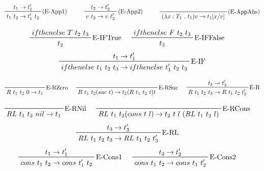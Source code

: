 \documentclass[12pt, titlepage, a4paper]{article}
\begin{document}
\begin{displaymath}
    \prftree[r]{(E-App1)}{t_1 \rightarrow t_1'}{t_1 \ t_2 \rightarrow t_1' \ t_2}  \hspace{1cm}
    \prftree[r]{(E-App2)}{t_2 \rightarrow t_2'}{v \ t_2 \rightarrow v \ t_2'}  \hspace{1cm}
    \prftree[r]{(E-AppAbs)}{}{(\lambda x : T_1 \ . \ t_1 ) v \rightarrow t_1[x/v]}
\end{displaymath}

\begin{displaymath}
    \prftree[r]{E-IFTrue}{ifthenelse \ T \ t_2 \ t_3}{t_2} \hspace{0.5cm}
    \prftree[r]{E-IFFalse}{ifthenelse \ F \ t_2 \ t_3}{t_3} \hspace{0.5cm}
\end{displaymath}
\begin{displaymath}
    \prftree[r]{E-IF}{t_1 \rightarrow t_1'}{ifthenelse \ t_1 \ t_2 \ t_3 \rightarrow ifthenelse \ t_1' \ t_2 \ t_3}
\end{displaymath}

\begin{displaymath}
    \prftree[r]{E-RZero}{R \ t_1 \ t_2 \ 0 \rightarrow t_1} \hspace{0.5cm}
    \prftree[r]{E-RSuc}{R \ t_1 \ t_2 (suc \ t) \rightarrow t_2 (R \ t_1 \ t_2 \ t) t} \hspace{0.5cm}
    \prftree[r]{E-R}{t_3 \rightarrow t_3'}{R \ t_1 \ t_2 \ t_3 \rightarrow R \ t_1 \ t_2 \ t_3'}
\end{displaymath}


\begin{displaymath}
    \prftree[r]{E-RNil}{RL \ t_1 \ t_2 \ nil \rightarrow t_1} \hspace{0.5cm}
    \prftree[r]{E-RCons}{RL \ t_1 \ t_2 (cons \ t \ l) \rightarrow t_2 \ t \ l \ (RL \ t_1 \ t_2 \ l)} \hspace{0.5cm}
\end{displaymath}
\begin{displaymath}
    \prftree[r]{E-RL}{t_3 \rightarrow t_3'}{RL \ t_1 \ t_2 \ t_3 \rightarrow RL \ t_1 \ t_2 \ t_3'} \hspace{0.5cm}
\end{displaymath}
\begin{displaymath}
  \prftree[r]{E-Cons1}{t_1 \rightarrow t_1'}{cons \ t_1 \ t_2 \rightarrow cons \ t_1' \ t_2} \hspace{0.5cm}
  \prftree[r]{E-Cons2}{t_2 \rightarrow t_2'}{cons \ t_1 \ t_2 \rightarrow cons \ t_1 \ t_2'} \hspace{0.5cm}
\end{displaymath}
\end{document}
